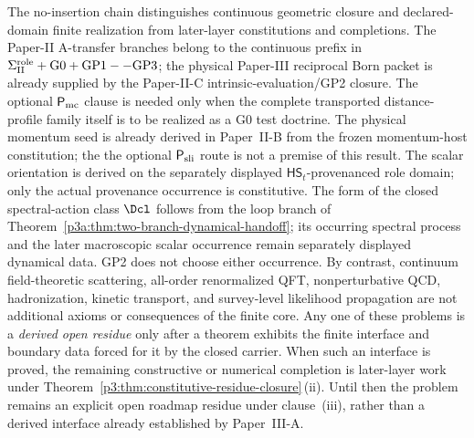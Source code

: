 \documentclass[11pt,a4paper]{article}
\begin{document}
\begin{corollary}
\label{p3:cor:closed-core-open-completions}
The no-insertion chain distinguishes continuous geometric closure and
declared-domain finite realization from later-layer constitutions and
completions.  The Paper-II A-transfer branches belong to the continuous prefix
in \(\Sigma_{\rm II}^{\rm role}+\mathrm{G0}+\mathrm{GP1--GP3}\); the physical
Paper-III reciprocal Born packet is already supplied by the Paper-II-C
intrinsic-evaluation/GP2 closure.  The optional \(\mathsf P_{\rm mc}\) clause
is needed only when the complete transported distance-profile family itself
is to be realized as a G0 test doctrine.  The physical momentum seed is
already derived in Paper~II-B from the frozen momentum-host constitution; the
the optional \(\mathsf P_{\rm sli}\) route is not a premise of this result.
The scalar orientation is derived on the separately displayed
\(\mathsf{HS}_t\)-provenanced role domain; only the actual provenance
occurrence is constitutive.  The form of the closed spectral-action class
\(\Dcl\) follows from the loop branch of
Theorem~\ref{p3a:thm:two-branch-dynamical-handoff}; its occurring spectral
process and the later macroscopic scalar occurrence remain separately
displayed dynamical data.  GP2 does not choose either occurrence.  By contrast, continuum
field-theoretic scattering, all-order renormalized QFT, nonperturbative QCD,
hadronization, kinetic transport, and survey-level likelihood propagation are
not additional axioms or consequences of the finite core.  Any one of these
problems is a \emph{derived open residue} only after a theorem exhibits the
finite interface and boundary data forced for it by the closed carrier.  When
such an interface is proved, the remaining constructive or numerical
completion is later-layer work under
Theorem~\ref{p3:thm:constitutive-residue-closure}\,(ii).  Until then the
problem remains an explicit open roadmap residue under clause~(iii), rather
than a derived interface already established by Paper~III-A.
\end{corollary}
\end{document}
